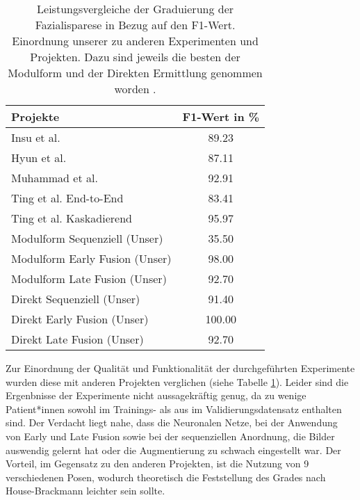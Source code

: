 \begin{table}[!h]\vspace{1ex}\centering
  \begin{tabular}{l||c|}
  \textbf{Projekte}                           & \textbf{F1-Wert in \%} \\ \hline\hline
  Insu et al. \cite{6583060}                    & 89.23   \\
  Hyun et al. \cite{s151026756}                 & 87.11   \\
  Muhammad et al. \cite{sym10070242}            & 92.91   \\
  Ting et al. End-to-End \cite{detection_fp2}   & 83.41   \\
  Ting et al. Kaskadierend \cite{detection_fp2} & 95.97   \\ \hline
  Modulform Sequenziell (Unser)                 & 35.50   \\
  Modulform Early Fusion (Unser)                & 98.00   \\
  Modulform Late Fusion (Unser)                 & 92.70   \\
  Direkt Sequenziell (Unser)                    & 91.40   \\
  Direkt Early Fusion (Unser)                   & 100.00  \\
  Direkt Late Fusion (Unser)                    & 92.70   \\ \hline
  \end{tabular}
  \caption[Leistungsvergleiche der Graduierung der Fazialisparese von verschiedenen Projekten]{Leistungsvergleiche der Graduierung der Fazialisparese in Bezug auf den F1-Wert. Einordnung unserer zu anderen Experimenten und Projekten. Dazu sind jeweils die besten der Modulform und der Direkten Ermittlung genommen worden \cite{detection_fp2}.}\label{cap:ref_tab}
\vspace{1ex}\end{table}\label{table:ref_tab}

\clearpage

Zur Einordnung der Qualität und Funktionalität der durchgeführten Experimente wurden diese mit anderen Projekten verglichen (siehe Tabelle \ref{cap:ref_tab}). Leider sind die Ergenbnisse der Experimente nicht aussagekräftig genug, da zu wenige Patient*innen sowohl im Trainings- als aus im Validierungsdatensatz enthalten sind. Der Verdacht liegt nahe, dass die Neuronalen Netze, bei der Anwendung von Early und Late Fusion sowie bei der sequenziellen Anordnung, die Bilder auswendig gelernt hat oder die Augmentierung zu schwach eingestellt war. Der Vorteil, im Gegensatz zu den anderen Projekten, ist die Nutzung von 9 verschiedenen Posen, wodurch theoretisch die Feststellung des Grades nach House-Brackmann leichter sein sollte.
